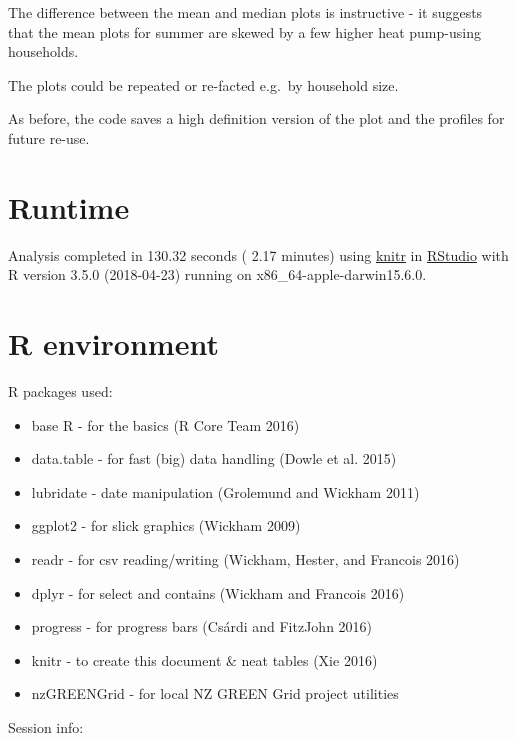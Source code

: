 \documentclass[]{article}
\providecommand{\tightlist}{%
  \setlength{\itemsep}{0pt}\setlength{\parskip}{0pt}}
\begin{document}
The difference between the mean and median plots is instructive - it
suggests that the mean plots for summer are skewed by a few higher heat
pump-using households.

The plots could be repeated or re-facted e.g.~by household size.

As before, the code saves a high definition version of the plot and the
profiles for future re-use.

\section{Runtime}\label{runtime}

Analysis completed in 130.32 seconds ( 2.17 minutes) using
\href{https://cran.r-project.org/package=knitr}{knitr} in
\href{http://www.rstudio.com}{RStudio} with R version 3.5.0 (2018-04-23)
running on x86\_64-apple-darwin15.6.0.

\section{R environment}\label{r-environment}

R packages used:

\begin{itemize}
\tightlist
\item
  base R - for the basics (R Core Team 2016)
\item
  data.table - for fast (big) data handling (Dowle et al. 2015)
\item
  lubridate - date manipulation (Grolemund and Wickham 2011)
\item
  ggplot2 - for slick graphics (Wickham 2009)
\item
  readr - for csv reading/writing (Wickham, Hester, and Francois 2016)
\item
  dplyr - for select and contains (Wickham and Francois 2016)
\item
  progress - for progress bars (Csárdi and FitzJohn 2016)
\item
  knitr - to create this document \& neat tables (Xie 2016)
\item
  nzGREENGrid - for local NZ GREEN Grid project utilities
\end{itemize}

Session info:
\end{document}
